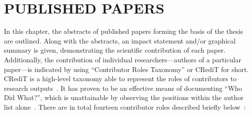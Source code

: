 \cleardoublepage

\chapter{PUBLISHED PAPERS}
\label{chap:5}
In this chapter, the abstracts of published papers forming the basis of the thesis are outlined.
Along with the abstracts, an impact statement and/or graphical summary is given, demonstrating the scientific contribution of each paper.
Additionally, the contribution of individual researchers---authors of a particular paper---is indicated by using ``Contributor Roles Taxonomy'' or CRediT for short.
CRediT is a high-level taxonomy able to represent the roles of contributors to research outputs~\cite{Allen2014CRediT}.
It has proven to be an effective means of documenting ``Who Did What?'', which is unattainable by observing the positions within the author list alone~\cite{Holcombe2020tenzing}.
There are in total fourteen contributor roles described briefly below~\cite{CRT2023Roles}:
